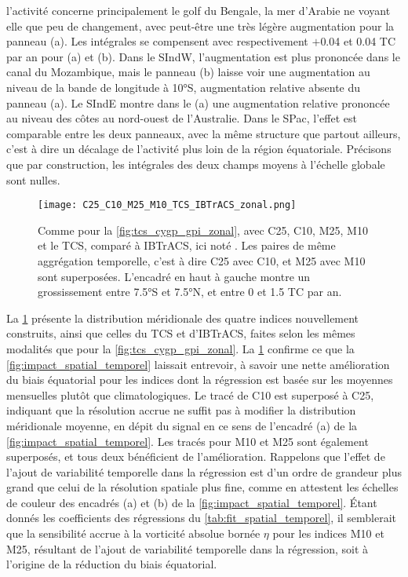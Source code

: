 \documentclass[../main.tex]{subfiles}
\begin{document}
l'activité concerne principalement le golf du Bengale, la mer d'Arabie ne voyant elle que peu de changement, avec peut-être une très légère augmentation pour la
panneau (a). Les intégrales se compensent avec respectivement $+$\num{0.04} et \num{0.04} TC par an pour (a) et (b). Dans le SIndW, l'augmentation est plus
prononcée dans le canal du Mozambique, mais le panneau (b) laisse voir une augmentation au niveau de la bande de longitude à \ang{10}S, augmentation relative
absente du panneau (a). Le SIndE montre dans le (a) une augmentation relative prononcée au niveau des côtes au nord-ouest de l'Australie. Dans le SPac, l'effet
est comparable entre les deux panneaux, avec la même structure que partout ailleurs, c'est à dire un décalage de l'activité plus loin de la région équatoriale.
Précisons que par construction, les intégrales des deux champs moyens à l'échelle globale sont nulles.

\begin{figure}[htb]
    \centering
    \texttt{[image: C25\_C10\_M25\_M10\_TCS\_IBTrACS\_zonal.png]}
    \caption{Comme pour la \cref{fig:tcs_cygp_gpi_zonal}, avec C25, C10, M25, M10 et le TCS, comparé à IBTrACS, ici noté . Les paires de même
    aggrégation temporelle, c'est à dire C25 avec C10, et M25 avec M10 sont superposées. L'encadré en haut à gauche montre un grossissement entre \ang{7.5}S et
    \ang{7.5}N, et entre 0 et \num{1.5} TC par an.}
    \label{fig:my_fit_meridional}
\end{figure}

La \cref{fig:my_fit_meridional} présente la distribution méridionale des quatre indices nouvellement construits, ainsi que celles du TCS et d'IBTrACS, faites selon
les mêmes modalités que pour la \cref{fig:tcs_cygp_gpi_zonal}. La \cref{fig:my_fit_meridional} confirme ce que la \cref{fig:impact_spatial_temporel} laissait
entrevoir, à savoir une nette amélioration du biais équatorial pour les indices dont la régression est basée sur les moyennes mensuelles plutôt que
climatologiques. Le tracé de C10 est superposé à C25, indiquant que la résolution accrue ne suffit pas à modifier la distribution méridionale moyenne, en dépit
du signal en ce sens de l'encadré (a) de la \cref{fig:impact_spatial_temporel}. Les tracés pour M10 et M25 sont également superposés, et tous deux bénéficient
de l'amélioration. Rappelons que l'effet de l'ajout de variabilité temporelle dans la régression est d'un ordre de grandeur plus grand que celui de la
résolution spatiale plus fine, comme en attestent les échelles de couleur des encadrés (a) et (b) de la \cref{fig:impact_spatial_temporel}. Étant donnés les
coefficients des régressions du \cref{tab:fit_spatial_temporel}, il semblerait que la sensibilité accrue à la vorticité absolue bornée $\eta$ pour les indices
M10 et M25, résultant de l'ajout de variabilité temporelle dans la régression, soit à l'origine de la réduction du biais équatorial.
\end{document}
